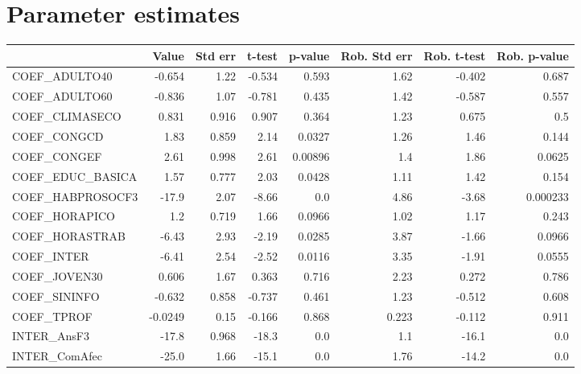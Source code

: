 \section{Parameter estimates}
\begin{tabular}{lrrrrrrr}
\toprule
{} &   Value &  Std err &  t-test &  p-value &  Rob. Std err &  Rob. t-test &  Rob. p-value \\
\midrule
COEF\_ADULTO40      &  -0.654 &     1.22 &  -0.534 &    0.593 &          1.62 &       -0.402 &         0.687 \\
COEF\_ADULTO60      &  -0.836 &     1.07 &  -0.781 &    0.435 &          1.42 &       -0.587 &         0.557 \\
COEF\_CLIMASECO     &   0.831 &    0.916 &   0.907 &    0.364 &          1.23 &        0.675 &           0.5 \\
COEF\_CONGCD        &    1.83 &    0.859 &    2.14 &   0.0327 &          1.26 &         1.46 &         0.144 \\
COEF\_CONGEF        &    2.61 &    0.998 &    2.61 &  0.00896 &           1.4 &         1.86 &        0.0625 \\
COEF\_EDUC\_BASICA   &    1.57 &    0.777 &    2.03 &   0.0428 &          1.11 &         1.42 &         0.154 \\
COEF\_HABPROSOCF3   &   -17.9 &     2.07 &   -8.66 &      0.0 &          4.86 &        -3.68 &      0.000233 \\
COEF\_HORAPICO      &     1.2 &    0.719 &    1.66 &   0.0966 &          1.02 &         1.17 &         0.243 \\
COEF\_HORASTRAB     &   -6.43 &     2.93 &   -2.19 &   0.0285 &          3.87 &        -1.66 &        0.0966 \\
COEF\_INTER         &   -6.41 &     2.54 &   -2.52 &   0.0116 &          3.35 &        -1.91 &        0.0555 \\
COEF\_JOVEN30       &   0.606 &     1.67 &   0.363 &    0.716 &          2.23 &        0.272 &         0.786 \\
COEF\_SININFO       &  -0.632 &    0.858 &  -0.737 &    0.461 &          1.23 &       -0.512 &         0.608 \\
COEF\_TPROF         & -0.0249 &     0.15 &  -0.166 &    0.868 &         0.223 &       -0.112 &         0.911 \\
INTER\_AnsF3        &   -17.8 &    0.968 &   -18.3 &      0.0 &           1.1 &        -16.1 &           0.0 \\
INTER\_ComAfec      &   -25.0 &     1.66 &   -15.1 &      0.0 &          1.76 &        -14.2 &           0.0 \\

\end{tabular}
